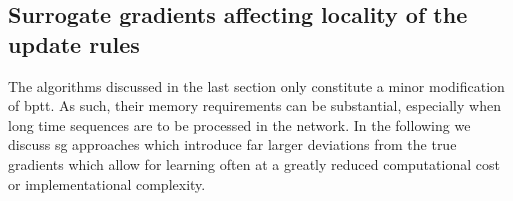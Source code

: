 \documentclass[journal,onecolumn,11pt]{IEEEtran}
\begin{document}





\subsection{Surrogate gradients affecting locality of the update rules}

The algorithms discussed in the last section only constitute a minor modification of \gls{bptt}. As such, their memory requirements can be substantial, especially when long time sequences are to be processed in the network.
In the following we discuss \gls{sg} approaches which introduce far larger deviations from the true gradients which allow for learning often at a greatly reduced computational cost or implementational complexity.
\end{document}
